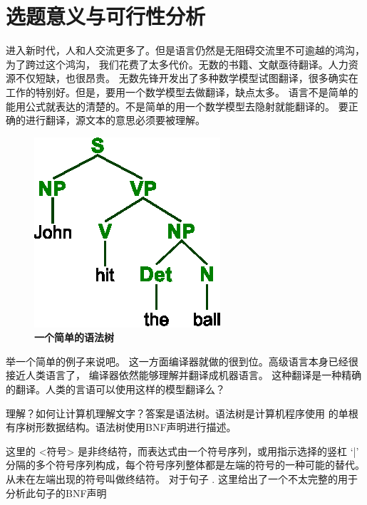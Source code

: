 
\section{选题意义与可行性分析}

进入新时代，人和人交流更多了。但是语言仍然是无阻碍交流里不可逾越的鸿沟，为了跨过这个鸿沟，
我们花费了太多代价。无数的书籍、文献亟待翻译。人力资源不仅短缺，也很昂贵。
无数先锋开发出了多种数学模型试图翻译，很多确实在工作的特别好。但是，要用一个数学模型去做翻译，缺点太多。
语言不是简单的能用公式就表达的清楚的。不是简单的用一个数学模型去隐射就能翻译的。
要正确的进行翻译，源文本的意思必须要被理解。

\begin{figure}%
\begin{center}%
\includegraphics{../pictures/ParseTree}%
\\\textbf{一个简单的语法树}%
\end{center}%
\end{figure}%
举一个简单的例子来说吧。
这一方面编译器就做的很到位。高级语言本身已经很接近人类语言了，
编译器依然能够理解并翻译成机器语言。
这种翻译是一种精确的翻译。人类的言语可以使用这样的模型翻译么？

\nocite{Compilers_Principles_Techniques_and_Tools}


理解？如何让计算机理解文字？答案是语法树\cite{cst}。语法树是计算机程序使用
的单根有序树形数据结构。语法树使用BNF\cite{BNF}声明进行描述。

\framedparbox{
 <symbol> ::= \_\_expression\_\_ 
 }
 
  这里的 <符号> 是非终结符，而表达式由一个符号序列，或用指示选择的竖杠 `|' 分隔的多个符号序列构成，每个符号序列整体都是左端的符号的一种可能的替代。从未在左端出现的符号叫做终结符。 
 对于句子 . 这里给出了一个不太完整的用于分析此句子的BNF声明 \\

